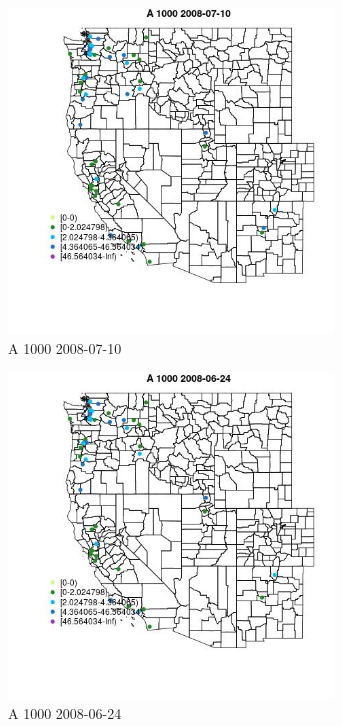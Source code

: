 \begin{figure} 
\centering  
\includegraphics[width=0.77\textwidth]{Code_Outputs/Report_ML_input_PM25_Step4_part_e_de_duplicated_aves_MapObsA_10002008-07-10.jpg} 
\caption{\label{fig:Report_ML_input_PM25_Step4_part_e_de_duplicated_avesMapObsA_10002008-07-10}A 1000 2008-07-10} 
\end{figure} 
 

\begin{figure} 
\centering  
\includegraphics[width=0.77\textwidth]{Code_Outputs/Report_ML_input_PM25_Step4_part_e_de_duplicated_aves_MapObsA_10002008-06-24.jpg} 
\caption{\label{fig:Report_ML_input_PM25_Step4_part_e_de_duplicated_avesMapObsA_10002008-06-24}A 1000 2008-06-24} 
\end{figure} 
 

